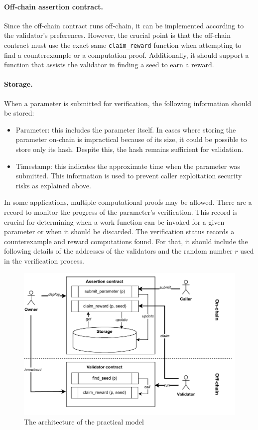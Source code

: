 \documentclass[runningheads]{llncs}
\begin{document}
\paragraph{Off-chain assertion contract.}
Since the off-chain contract runs off-chain, it can be implemented according to the validator's preferences. However, the crucial point is that the off-chain contract must use the exact same \lstinline|claim_reward| function when attempting to find a counterexample or a computation proof. Additionally, it should support a function that assists the validator in finding a seed to earn a reward.
\paragraph{Storage.}
When a parameter is submitted for verification, the following information should be stored:
\begin{itemize}
\item Parameter: this includes the parameter itself. In cases where storing the parameter on-chain is impractical because of its size, it could be possible to store only its hash. Despite this, the hash remains sufficient for validation.
\item Timestamp: this indicates the approximate time when the parameter was submitted. This information is used to prevent caller exploitation security risks as explained above.
\end{itemize}

In some applications, multiple computational proofs may be allowed. There are a record to monitor the progress of the parameter's verification. This record is crucial for determining when a work function can be invoked for a given parameter or when it should be discarded. The verification status records a counterexample and reward computations found. For that, it should include the following details of the addresses of the validators and the random number $r$ used in the verification process.
\begin{figure}
\centering
\includegraphics[scale=.8]{assertion}
\caption{The architecture of the practical model}
\label{fig.architect}
\end{figure}
\end{document}
